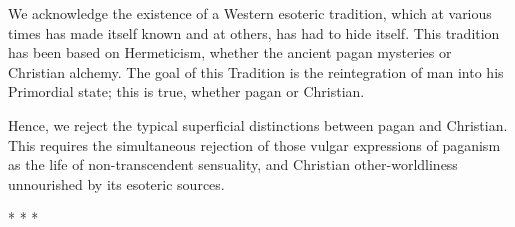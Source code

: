 We acknowledge the existence of a Western esoteric tradition, which at various times has made itself known and at others, has had to hide itself. This tradition has been based on Hermeticism, whether the ancient pagan mysteries or Christian alchemy. The goal of this Tradition is the reintegration of man into his Primordial state; this is true, whether pagan or Christian. 

Hence, we reject the typical superficial distinctions between pagan and Christian. This requires the simultaneous rejection of those vulgar expressions of paganism as the life of non-transcendent sensuality, and Christian other-worldliness unnourished by its esoteric sources.




\begin{center}* * *\end{center}

